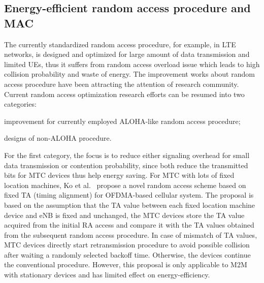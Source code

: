\subsection{Energy-efficient random access procedure and MAC}
The currently standardized random access procedure, for example, in LTE networks, is designed and optimized for large amount of data transmission and limited UEs, thus it suffers from random access overload issue which leads to high collision probability and waste of energy. The improvement works about random access procedure have been attracting the attention of research community. Current random access optimization research efforts can be resumed into two categories:\begin{inparaenum}[i)]
	\item improvement for currently employed ALOHA-like random access procedure;
	\item designs of non-ALOHA procedure.
\end{inparaenum}

For the first category, the focus is to reduce either signaling overhead for small data transmission or contention probability, since both reduce the transmitted bits for MTC devices thus help energy saving. For MTC with lots of fixed location machines, Ko et al.~\cite{journals/icl/KoKBSKA12} propose a novel random access scheme based on fixed TA (timing alignment) for OFDMA-based cellular system. The proposal is based on the assumption that the TA value between each fixed location machine device and eNB is fixed and unchanged, the MTC devices store the TA value acquired from the initial RA access and compare it with the TA values obtained from the subsequent random access procedure. In case of mismatch of TA values,  MTC devices directly start retransmission procedure to avoid possible collision after waiting a randomly selected backoff time. Otherwise, the devices continue the conventional procedure. However, this proposal is only applicable to M2M with stationary devices and has limited effect on energy-efficiency. 

